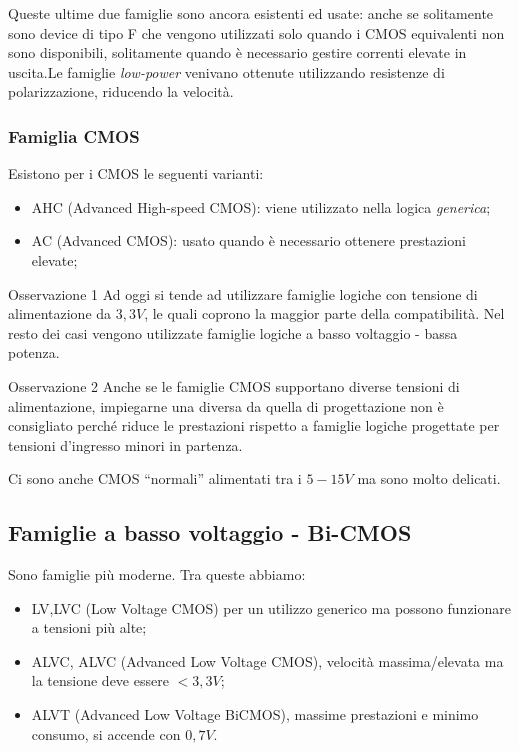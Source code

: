 \documentclass[
]{book}
\providecommand{\tightlist}{%
  \setlength{\itemsep}{0pt}\setlength{\parskip}{0pt}}
\begin{document}
Queste ultime due famiglie sono ancora esistenti ed usate: anche se
solitamente sono device di tipo F che vengono utilizzati solo quando i
CMOS equivalenti non sono disponibili, solitamente quando è necessario
gestire correnti elevate in uscita.\newline Le famiglie \emph{low-power}
venivano ottenute utilizzando resistenze di polarizzazione, riducendo la
velocità.

\subsubsection{Famiglia CMOS}\label{famiglia-cmos}

Esistono per i CMOS le seguenti varianti:

\begin{itemize}
\tightlist
\item
  AHC (Advanced High-speed CMOS): viene utilizzato nella logica
  \emph{generica};
\item
  AC (Advanced CMOS): usato quando è necessario ottenere prestazioni
  elevate;
\end{itemize}

\begin{redbox}{Osservazione 1}
Ad oggi si tende ad utilizzare famiglie logiche con tensione di alimentazione da $3,3V$, le quali coprono la maggior parte della compatibilità. Nel resto dei casi vengono utilizzate famiglie logiche a basso voltaggio - bassa potenza.
\end{redbox}

\begin{bluebox}{Osservazione 2}
Anche se le famiglie CMOS supportano diverse tensioni di alimentazione, impiegarne una diversa da quella di progettazione non è consigliato perché riduce le prestazioni rispetto a famiglie logiche progettate per tensioni d'ingresso minori in partenza.
\end{bluebox}

Ci sono anche CMOS ``normali'' alimentati tra i \(5-15V\) ma sono molto
delicati.

\subsection{Famiglie a basso voltaggio -
Bi-CMOS}\label{famiglie-a-basso-voltaggio---bi-cmos}

Sono famiglie più moderne. Tra queste abbiamo:

\begin{itemize}
\tightlist
\item
  LV,LVC (Low Voltage CMOS) per un utilizzo generico ma possono
  funzionare a tensioni più alte;
\item
  ALVC, ALVC (Advanced Low Voltage CMOS), velocità massima/elevata ma la
  tensione deve essere \(<3,3V\);
\item
  ALVT (Advanced Low Voltage BiCMOS), massime prestazioni e minimo
  consumo, si accende con \(0,7V\).
\end{itemize}
\end{document}
